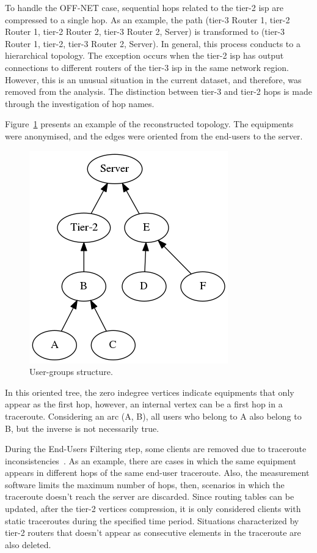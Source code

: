 To handle the OFF-NET case, sequential hops related to
the tier-2 \gls*{isp} are compressed to a single hop.
As an example, the path (tier-3 Router 1, tier-2 Router 1, tier-2 Router 2,
tier-3 Router 2, Server) is
transformed to (tier-3 Router 1, tier-2, tier-3 Router 2, Server).
In general, this process conducts to a hierarchical topology.
The exception occurs when the tier-2 \gls*{isp} has output connections to
different routers of the tier-3 \gls*{isp} in the same network region.
However, this is an unusual situation in
the current dataset, and therefore, was removed from the analysis.
The distinction between
tier-3 and tier-2 hops is made through the investigation of hop names.

Figure~\ref{fig:real_graph} presents an example of the reconstructed
topology. The equipments were anonymised, and the edges were oriented from the
end-users to the server.

\begin{figure}[H]
    \centering
    \includegraphics[width=0.35\linewidth]{./figures/methodology/spatial_correlation/dtstart2016-05-01_dtend2016-05-11_NRIDTCLDM031_graph_anonymized.png}
    \caption{User-groups structure.}
\label{fig:real_graph}
\end{figure}%

In this oriented tree, the zero
indegree vertices indicate equipments that only appear as the first hop,
however, an internal vertex can be a first hop in a traceroute.
Considering an arc (A, B), all users who belong to A also belong to B,
but the inverse is not necessarily true.

During the End-Users Filtering step, some clients are removed due to traceroute
inconsistencies~\cite{avoiding_traceroute_anomalies_with_paris_traceroute}.
As an example, there are cases in which the same equipment appears in different
hops of the same end-user traceroute. Also,
the measurement software limits the maximum number of hops, then,
scenarios in which the traceroute doesn't reach the server are discarded.
Since routing tables can be updated, after the tier-2 vertices compression,
it is only considered clients with static traceroutes
during the specified time period.
Situations characterized by tier-2 routers that doesn't appear as consecutive
elements in the traceroute are also deleted.

